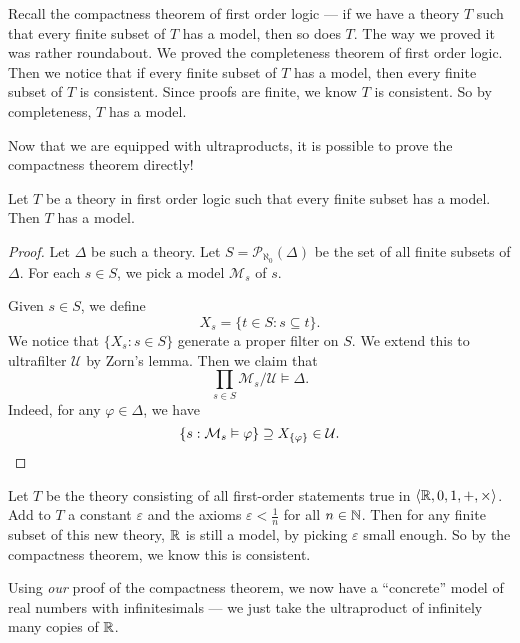 \documentclass[a4paper]{article}
\begin{document}
Recall the compactness theorem of first order logic --- if we have a theory $T$ such that every finite subset of $T$ has a model, then so does $T$. The way we proved it was rather roundabout. We proved the completeness theorem of first order logic. Then we notice that if every finite subset of $T$ has a model, then every finite subset of $T$ is consistent. Since proofs are finite, we know $T$ is consistent. So by completeness, $T$ has a model.

Now that we are equipped with ultraproducts, it is possible to prove the compactness theorem directly!
\begin{thm}
  Let $T$ be a theory in first order logic such that every finite subset has a model. Then $T$ has a model.
\end{thm}

\begin{proof}
  Let $\Delta$ be such a theory. Let $S = \mathcal{P}_{\aleph_0}(\Delta)$ be the set of all finite subsets of $\Delta$. For each $s \in S$, we pick a model $\mathcal{M}_s$ of $s$.

  Given $s \in S$, we define
  \[
    X_s = \{t \in S: s \subseteq t\}.
  \]
  We notice that $\{X_s: s \in S\}$ generate a proper filter on $S$. We extend this to ultrafilter $\mathcal{U}$ by Zorn's lemma. Then we claim that
  \[
    \prod_{s \in S} \mathcal{M}_s/\mathcal{U}\vDash \Delta.
  \]
  Indeed, for any $\varphi \in \Delta$, we have
  \[
    \{s: \mathcal{M}_s \vDash \varphi\} \supseteq X_{\{\varphi\}} \in \mathcal{U}.\qedhere
  \]
\end{proof}

\begin{eg}
  Let $T$ be the theory consisting of all first-order statements true in $\langle \mathbb{R}, 0, 1, +, \times\rangle$. Add to $T$ a constant $\varepsilon$ and the axioms $\varepsilon < \frac{1}{n}$ for all $n \in \mathbb{N}$. Then for any finite subset of this new theory, $\mathbb{R}$ is still a model, by picking $\varepsilon$ small enough. So by the compactness theorem, we know this is consistent.

  Using \emph{our} proof of the compactness theorem, we now have a ``concrete'' model of real numbers with infinitesimals --- we just take the ultraproduct of infinitely many copies of $\mathbb{R}$.
\end{eg}
\end{document}
